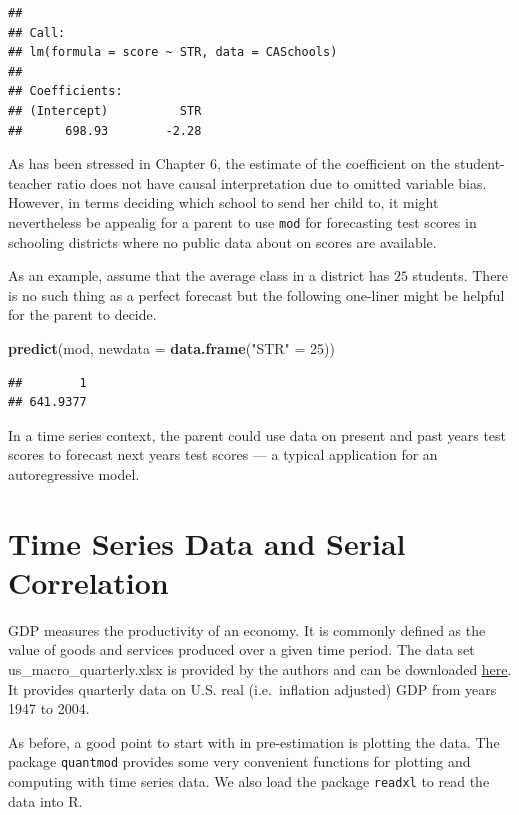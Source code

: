 \documentclass[]{book}
\newenvironment{Shaded}{\begin{snugshade}}{\end{snugshade}}
\newcommand{\KeywordTok}[1]{\textcolor[rgb]{0.13,0.29,0.53}{\textbf{#1}}}
\newcommand{\DataTypeTok}[1]{\textcolor[rgb]{0.13,0.29,0.53}{#1}}
\newcommand{\DecValTok}[1]{\textcolor[rgb]{0.00,0.00,0.81}{#1}}
\newcommand{\StringTok}[1]{\textcolor[rgb]{0.31,0.60,0.02}{#1}}
\newcommand{\NormalTok}[1]{#1}
\theoremstyle{definition}
\theoremstyle{definition}
\theoremstyle{definition}
\theoremstyle{remark}
\begin{document}
\begin{verbatim}
## 
## Call:
## lm(formula = score ~ STR, data = CASchools)
## 
## Coefficients:
## (Intercept)          STR  
##      698.93        -2.28
\end{verbatim}

As has been stressed in Chapter 6, the estimate of the coefficient on
the student-teacher ratio does not have causal interpretation due to
omitted variable bias. However, in terms deciding which school to send
her child to, it might nevertheless be appealig for a parent to use
\texttt{mod} for forecasting test scores in schooling districts where no
public data about on scores are available.

As an example, assume that the average class in a district has \(25\)
students. There is no such thing as a perfect forecast but the following
one-liner might be helpful for the parent to decide.

\begin{Shaded}
\begin{Highlighting}[]
\KeywordTok{predict}\NormalTok{(mod, }\DataTypeTok{newdata =} \KeywordTok{data.frame}\NormalTok{(}\StringTok{"STR"}\NormalTok{ =}\StringTok{ }\DecValTok{25}\NormalTok{))}
\end{Highlighting}
\end{Shaded}

\begin{verbatim}
##        1 
## 641.9377
\end{verbatim}

In a time series context, the parent could use data on present and past
years test scores to forecast next years test scores --- a typical
application for an autoregressive model.

\section{Time Series Data and Serial
Correlation}\label{time-series-data-and-serial-correlation}

GDP measures the productivity of an economy. It is commonly defined as
the value of goods and services produced over a given time period. The
data set us\_macro\_quarterly.xlsx is provided by the authors and can be
downloaded
\href{http://wps.aw.com/aw_stock_ie_3/178/45691/11696965.cw/index.html}{here}.
It provides quarterly data on U.S. real (i.e.~inflation adjusted) GDP
from years 1947 to 2004.

As before, a good point to start with in pre-estimation is plotting the
data. The package \texttt{quantmod} provides some very convenient
functions for plotting and computing with time series data. We also load
the package \texttt{readxl} to read the data into R.
\end{document}
